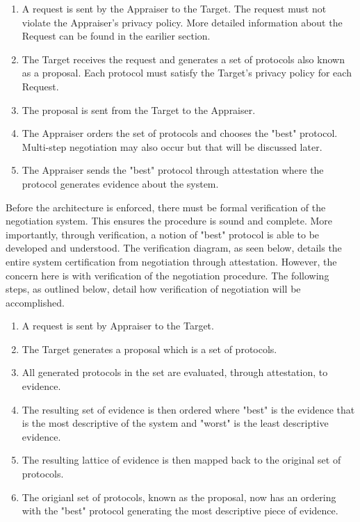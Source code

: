 \documentclass[10pt]{report}
\begin{document}
\begin{enumerate}
\item A request is sent by the Appraiser to the Target. The request must not
  violate the Appraiser's privacy policy. More detailed information about the
  Request can be found in the earilier section. 
\item The Target receives the request and generates a set of protocols also
  known as a proposal. Each protocol must satisfy the Target's privacy policy
  for each Request. 
\item The proposal is sent from the Target to the Appraiser.  
\item The Appraiser orders the set of protocols and chooses the "best" protocol.
  Multi-step negotiation may also occur but that will be discussed later. 
\item The Appraiser sends the "best" protocol through attestation where the
  protocol generates evidence about the system. 
\end{enumerate}

Before the architecture is enforced, there must be formal verification of the
negotiation system. This ensures the procedure is sound and complete. More
importantly, through verification, a notion of "best" protocol is able to be
developed and understood. The verification diagram, as seen below, details
the entire system certification from negotiation through attestation. However,
the concern here is with verification of the negotiation procedure. The
following steps, as outlined below, detail how verification of negotiation
will be accomplished.  

\begin{enumerate}
\item A request is sent by Appraiser to the Target.
\item The Target generates a proposal which is a set of protocols.
\item All generated protocols in the set are evaluated, through attestation,
  to evidence. 
\item The resulting set of evidence is then ordered where "best" is the evidence
  that is the most descriptive of the system and "worst" is the least descriptive
  evidence. 
\item The resulting lattice of evidence is then mapped back to the original set
  of protocols. 
\item The origianl set of protocols, known as the proposal, now has an ordering
  with the "best" protocol generating the most descriptive piece of evidence.
\end{enumerate}
\end{document}
